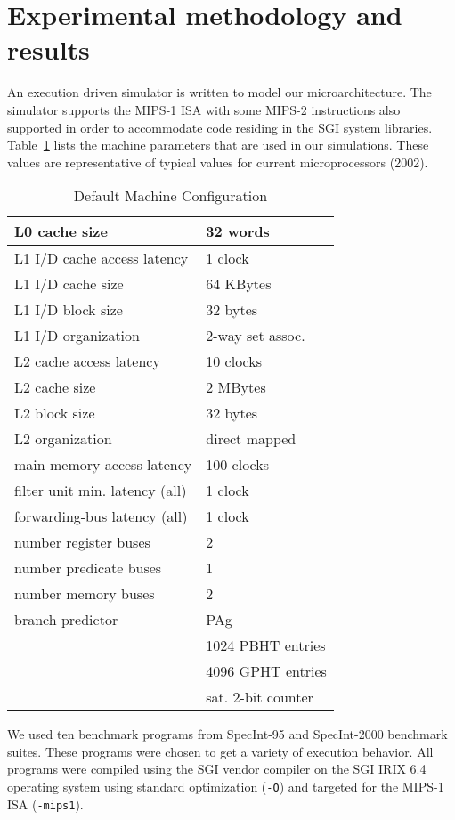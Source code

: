 \documentclass[10pt,twocolumn]{IEEEtran}
\begin{document}
\section{Experimental methodology and results}
\label{sec:eval}
%
An execution driven simulator is written to model our
microarchitecture.  
The simulator supports the MIPS-1 ISA with some
MIPS-2 instructions also supported in order to accommodate code
residing in the SGI system libraries.  Table~\ref{tab:maconf} lists the
machine parameters that are used in our simulations. 
These values are representative of typical values 
for current microprocessors (2002).  
%
\begin{table}
\begin{center}
\caption{Default Machine Configuration}
\label{tab:maconf}
\scriptsize{
\begin{tabular}{|l|l|}
\hline
L0 cache size&32 words\\
\hline
L1 I/D cache access latency&1 clock\\
\hline
L1 I/D cache size&64 KBytes\\
\hline
L1 I/D block size&32 bytes\\
\hline
L1 I/D organization&2-way set assoc.\\
\hline
L2 cache access latency&10 clocks\\
\hline
L2 cache size&2 MBytes\\
\hline
L2 block size&32 bytes\\
\hline
L2 organization&direct mapped\\
\hline
main memory access latency&100 clocks\\
\hline
f{il}ter unit min. latency (all)&1 clock\\
\hline
forwarding-bus latency (all)&1 clock\\
\hline
number register buses&2\\
\hline
number predicate buses&1\\
\hline
number memory buses&2\\
\hline
branch predictor&PAg\\
\cline{2-2}
 & 1024 PBHT entries\\
\cline{2-2}
 & 4096 GPHT entries\\
\cline{2-2}
 & sat. 2-bit counter\\
\hline
\end{tabular}
}
\end{center}
\end{table}
%
We used ten benchmark programs from SpecInt-95 and SpecInt-2000
benchmark suites.  These programs were chosen to get a variety
of execution behavior.  All programs were compiled using the SGI vendor
compiler on the SGI IRIX 6.4 operating system using standard
optimization ({\tt -O}) and targeted for the MIPS-1 ISA ({\tt -mips1}).
\end{document}
